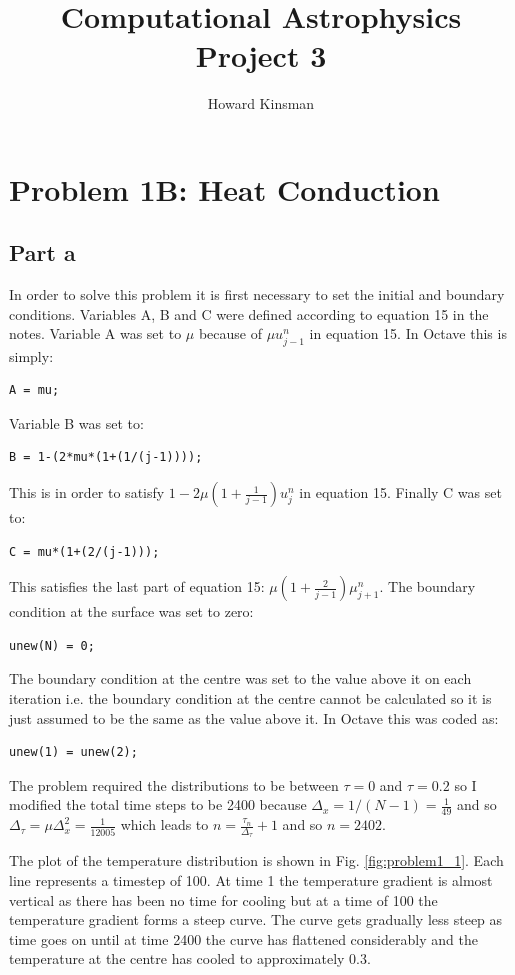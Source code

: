 \documentclass[a4paper,12pt]{article}
\author{Howard Kinsman}
\title{Computational Astrophysics Project 3}
\begin{document}
\maketitle
\section{Problem 1B: Heat Conduction}
\subsection{Part a}
In order to solve this problem it is first necessary to set the initial and boundary conditions. Variables A, B and C were defined according to equation 15 in the notes. Variable A was set to $\mu$ because of $\mu u^n_{j-1}$ in equation 15. In Octave this is simply:
\begin{lstlisting}
A = mu;
\end{lstlisting}
Variable B was set to:
\begin{lstlisting}
B = 1-(2*mu*(1+(1/(j-1))));
\end{lstlisting}
This is in order to satisfy $1-2\mu(1+\frac{1}{j-1})u^n_j$ in equation 15. Finally C was set to:
\begin{lstlisting}
C = mu*(1+(2/(j-1)));
\end{lstlisting}
This satisfies the last part of equation 15: $\mu(1+\frac{2}{j-1})\mu^n_{j+1}$.
\newline
The boundary condition at the surface was set to zero:
\begin{lstlisting}
unew(N) = 0;
\end{lstlisting}
The boundary condition at the centre was set to the value above it on each iteration i.e. the boundary condition at the centre cannot be calculated so it is just assumed to be the same as the value above it. In Octave this was coded as:
\begin{lstlisting}
unew(1) = unew(2);
\end{lstlisting}
The problem required the distributions to be between $\tau=0$ and $\tau=0.2$ so I modified the total time steps to be 2400 because $\Delta_x=1/\left(N-1\right)=\frac{1}{49}$ and so $\Delta_{\tau}=\mu\Delta_x^2=\frac{1}{12005}$ which leads to $n=\frac{\tau_n}{\Delta_{\tau}}+1$ and so $n=2402$.

The plot of the temperature distribution is shown in Fig. \ref{fig:problem1_1}. Each line represents a timestep of 100. At time 1 the temperature gradient is almost vertical as there has been no time for cooling but at a time of 100 the temperature gradient forms a steep curve. The curve gets gradually less steep as time goes on until at time 2400 the curve has flattened considerably and the temperature at the centre has cooled to approximately 0.3.
\end{document}
